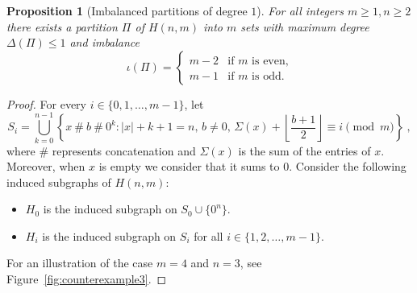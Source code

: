 \documentclass[10pt,a4paper]{amsart}
\newtheorem{prop}{Proposition}
\begin{document}
\begin{prop}[{\sf Imbalanced partitions of degree $1$}]
\label{prop:FirstConstruction}
For all integers $m\geq 1, n\geq 2$ there exists a partition $\Pi$ of $H(n,m)$ into $m$ sets with maximum degree $\Delta(\Pi)\leq 1$ and imbalance \[\iota(\Pi)= \begin{cases} m-2 & \text{if } m \text{ is even,}\\
m-1 & \text{if } m \text{ is odd.}\end{cases}\]
\end{prop}

\begin{proof}
    For every $i\in\{0,1,\dots,m-1\}$, let
\[
 S_i = \bigcup_{k=0}^{n-1} \left\{ x  \ \#\ b \ \#\ 0^k : |x| + k + 1 = n,\, b \neq 0,\, \Sigma(x) + \left\lfloor \frac{b+1}{2} \right\rfloor \equiv i \pmod{m} \right\}\ ,
\]
where $\#$ represents concatenation and $\Sigma(x)$ is the sum of the entries of $x$. Moreover, when $x$ is empty  we consider that it sums to $0$. Consider the following induced subgraphs of $H(n,m)$:
    \begin{itemize}
        \item $H_0$ is the induced subgraph on $S_0\cup\{0^n\}$.
        \item $H_i$ is the induced subgraph on $S_i$ for all $i\in\{1,2,\dots,m-1\}.$
    \end{itemize}

For an illustration of the case 
 $m=4$ and $n=3$,
see Figure~\ref{fig:counterexample3}.


\end{proof}
\end{document}
